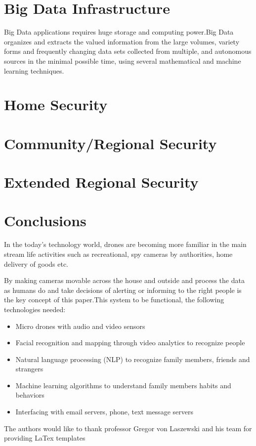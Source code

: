 \documentclass[sigconf]{acmart}
\begin{document}
\section{Big Data Infrastructure}
Big Data applications requires huge storage and computing power.Big Data organizes and extracts the valued information from the large volumes, variety forms and frequently changing data sets collected from multiple, and autonomous sources 
in the minimal possible time, using several mathematical and machine learning techniques.
\section{Home Security}

\section{Community/Regional Security}

\section{Extended Regional Security}

\section{Conclusions}
In the today's technology world, drones are becoming more familiar in the main stream life activities such as recreational, spy cameras by authorities, home delivery of goods etc.

By making cameras movable across the house and outside and process the data as humans do and take decisions of alerting or informing to the right people is the key concept of this paper.This system to be functional, the following technologies needed:

\begin{itemize}
  
\item Micro drones with audio and video sensors

\item Facial recognition and mapping through video analytics to recognize people
	
\item Natural language processing (NLP) to recognize family members, friends and strangers

\item Machine learning algorithms to understand family members habits and behaviors

\item Interfacing with email servers, phone, text message servers

\end{itemize}

\begin{acks}
The authors would like to thank professor Gregor von Laszewski and his team for providing LaTex templates
\end{acks}


 
\end{document}
